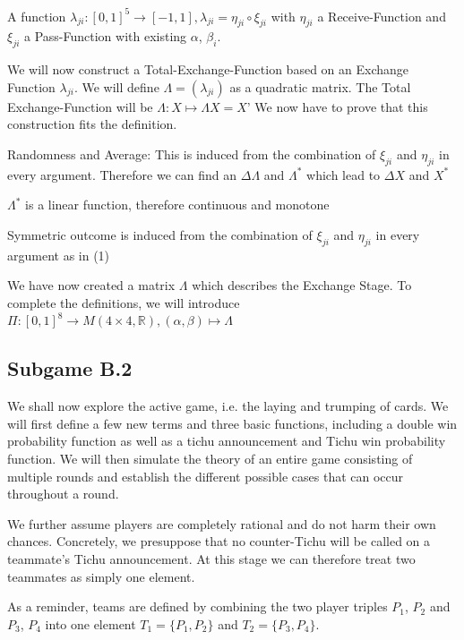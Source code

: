 \begin{definition}
A function $\lambda_{ji}: [0,1]^5 \to [-1,1], \lambda_{ji} = \eta_{ji} \circ \xi_{ji}$ with $\eta_{ji}$ a Receive-Function and $\xi_{ji}$ a Pass-Function with existing $\alpha$, $\beta_i$.
\end{definition}
\begin{remark}[Construction]
We will now construct a Total-Exchange-Function based on an Exchange Function $\lambda_{ji}$. We will define $\Lambda = (\lambda_{ji})$ as a quadratic matrix. 
The Total Exchange-Function will be $\Lambda: X \mapsto \Lambda X = X’$
We now have to prove that this construction fits the definition.
\begin{axioms}[(1)]
\item Randomness and Average: This is induced from the combination of $\xi_{ji}$ and $\eta_{ji}$ in every argument. Therefore we can find an $\Delta \Lambda$ and $\Lambda^* $ which lead to $\Delta X $ and 
$X^*$
\item $\Lambda^*$ is a linear function, therefore continuous and monotone
\item Symmetric outcome is induced from the combination of $\xi_{ji}$ and $\eta_{ji}$ in every argument as in (1)
\end{axioms}
We have now created a matrix $\Lambda$ which describes the Exchange Stage. To complete the definitions, we will introduce $ \Pi : [0,1]^8 \to M(4 \times 4, \mathbb{R}), (\alpha, \beta) \mapsto \Lambda $
\end{remark}

\subsection{Subgame B.2}
We shall now explore the active game, i.e. the laying and trumping of cards. We will first define a few new terms and three basic functions, including a double win probability function as well as a tichu announcement and Tichu win probability function. We will then simulate the theory of an entire game consisting of multiple rounds and establish the different possible cases that can occur throughout a round.

We further assume players are completely rational and do not harm their own chances. Concretely, we presuppose that no counter-Tichu will be called on a teammate’s Tichu announcement. At this stage we can therefore treat two teammates as simply one element.

As a reminder, teams are defined by combining the two player triples $P_1$, $P_2$ and $P_3$, $P_4$ into one element $T_1 = \{P_1,P_2\}$ and $T_2 = \{P_3,P_4\}$.

